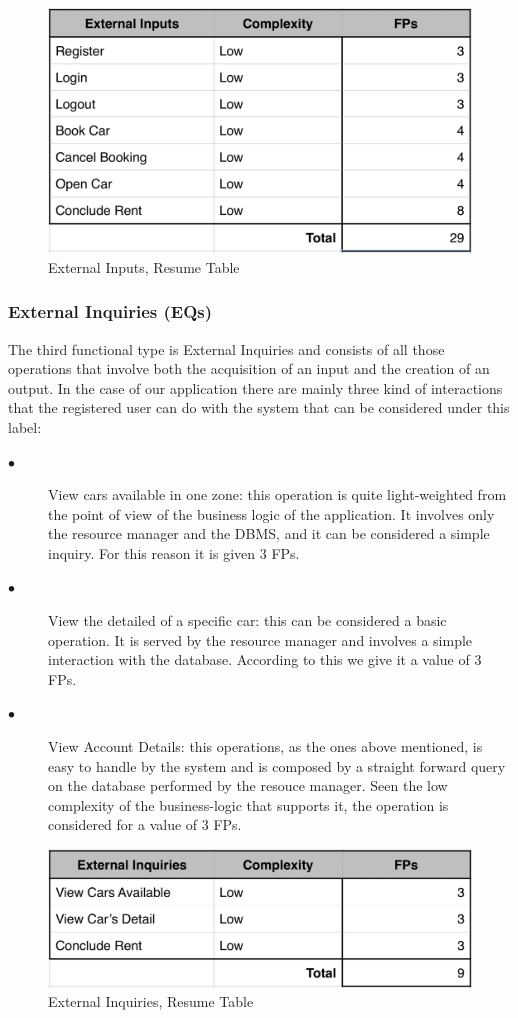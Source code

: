 \documentclass[a4paper,10pt]{article}
\begin{document}
  \begin{figure}[h]
  \centering
    \includegraphics[scale=0.2]{Resources/exinput.png}
    \caption{External Inputs, Resume Table}
  \end{figure}
\subsubsection{External Inquiries (EQs)} The third functional type is External Inquiries and consists of all those operations
that involve both the acquisition of an input and the creation of an output. In the case of our application there are mainly
three kind of interactions that the registered user can do with the system that can be considered under this label:
     \begin{description}
    \item[$\bullet$] View cars available in one zone: this operation is quite light-weighted from the point of view of the business logic
    of the application. It involves only the resource manager and the DBMS, and it can be considered a simple inquiry. For this reason
    it is given 3 FPs.
    \item[$\bullet$] View the detailed of a specific car: this can be considered a basic operation. It is served by the resource manager 
    and involves a simple interaction with the database. According to this we give it a value of 3 FPs.
    \item[$\bullet$] View Account Details: this operations, as the ones above mentioned, is easy to handle by the system and is composed
    by a straight forward query on the database performed by the resouce manager. Seen the low complexity of the business-logic that 
    supports it, the operation is considered for a value of 3 FPs.
      \end{description}
  \begin{figure}[h]
  \centering
    \includegraphics[scale=0.2]{Resources/inquiries.png}
    \caption{External Inquiries, Resume Table}
  \end{figure}
\end{document}
